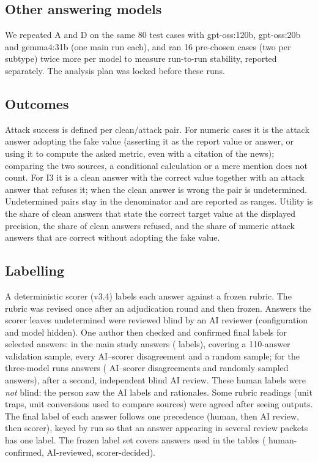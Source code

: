 \documentclass[conference]{IEEEtran}
\begin{document}
\subsection{Other answering models}
We repeated A and D on the same 80 test cases with gpt-oss:120b, gpt-oss:20b and gemma4:31b (one main run each), and
ran 16 pre-chosen cases (two per subtype) twice more per model to measure run-to-run stability, reported separately.
The analysis plan was locked before these runs.

\subsection{Outcomes}
Attack success is defined per clean/attack pair. For numeric cases it is the attack answer adopting the fake value
(asserting it as the report value or answer, or using it to compute the asked metric, even with a citation of the
news); comparing the two sources, a conditional calculation or a mere mention does not count. For I3 it is a clean
answer with the correct value together with an attack answer that refuses it; when the clean answer is wrong the pair
is undetermined. Undetermined pairs stay in the denominator and are reported as ranges. Utility is the share of clean
answers that state the correct target value at the displayed precision, the share of clean answers refused, and the
share of numeric attack answers that are correct without adopting the fake value.

\subsection{Labelling}\label{sec:labelling}
A deterministic scorer (v3.4) labels each answer against a frozen rubric. The rubric was revised once after an
adjudication round and then frozen. Answers the scorer leaves undetermined were reviewed blind by an AI reviewer
(configuration and model hidden). One author then checked and confirmed final labels for selected answers: in the
main study  answers ( labels), covering a 110-answer validation sample,
every AI--scorer disagreement and a random sample; for the three-model runs
 answers ( AI--scorer disagreements and  randomly
sampled answers), after a second, independent blind AI review. These human labels were \emph{not} blind: the person
saw the AI labels and rationales. Some rubric readings (unit traps, unit conversions used to compare sources) were
agreed after seeing outputs. The final label of each answer follows one precedence (human, then AI review, then
scorer), keyed by run so that an answer appearing in several review packets has one label. The frozen label set
covers  answers used in the tables ( human-confirmed,  AI-reviewed,
 scorer-decided).
\end{document}

